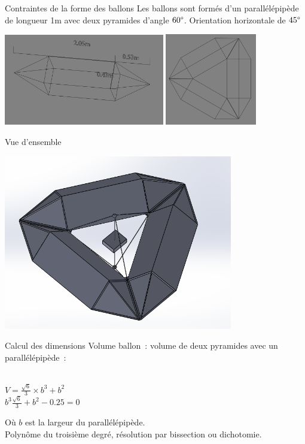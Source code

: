 \begin{frame}{Contraintes de la forme des ballons}
  Les ballons sont formés d'un parallélépipède de longueur 1m avec deux pyramides d'angle $60\degree$. Orientation horizontale de $45\degree$ \\
  \begin{center}
    \includegraphics[width=7cm]{../Images/ballon.png}
    \includegraphics[width=4cm]{../Images/ballon3.png}
  \end{center}
\end{frame}

\begin{frame}{Vue d'ensemble}
 \begin{center}
		\includegraphics[width=10cm]{../Images/structure1_0.PNG}
 \end{center}
\end{frame}

\begin{frame}{Calcul des dimensions}
  Volume ballon~: volume de deux pyramides avec un parallélépipède~:
  \begin{center}
	 \\
	$\displaystyle{V = \frac{\sqrt{6}}{3} \times b^3 + b^2 }$ \\
	$\displaystyle{b^3 \frac{\sqrt{6}}{3} + b^2 - 0.25 = 0}$
  \end{center}
  Où $b$ est la largeur du parallélépipède. \\
  Polynôme du troisième degré, résolution par bissection ou dichotomie.
\end{frame}

